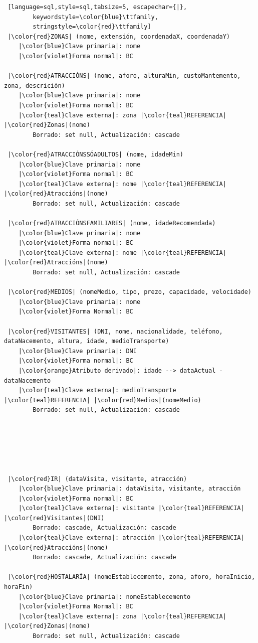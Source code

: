 \documentclass[12pt,a4paper]{book}
\theoremstyle{definition}
\theoremstyle{break}
\begin{document}
	\begin{lstlisting} [language=sql,style=sql,tabsize=5, escapechar={|},
		keywordstyle=\color{blue}\ttfamily,
		stringstyle=\color{red}\ttfamily]
 |\color{red}ZONAS| (nome, extensión, coordenadaX, coordenadaY)
	|\color{blue}Clave primaria|: nome
	|\color{violet}Forma normal|: BC
	
 |\color{red}ATRACCIÓNS| (nome, aforo, alturaMin, custoMantemento, zona, descrición)
 	|\color{blue}Clave primaria|: nome
 	|\color{violet}Forma normal|: BC
 	|\color{teal}Clave externa|: zona |\color{teal}REFERENCIA| |\color{red}Zonas|(nome)
 		Borrado: set null, Actualización: cascade
		
 |\color{red}ATRACCIÓNSSÓADULTOS| (nome, idadeMin)
	|\color{blue}Clave primaria|: nome
	|\color{violet}Forma normal|: BC
	|\color{teal}Clave externa|: nome |\color{teal}REFERENCIA| |\color{red}Atraccións|(nome)
		Borrado: set null, Actualización: cascade
		
 |\color{red}ATRACCIÓNSFAMILIARES| (nome, idadeRecomendada)
	|\color{blue}Clave primaria|: nome
	|\color{violet}Forma normal|: BC
	|\color{teal}Clave externa|: nome |\color{teal}REFERENCIA| |\color{red}Atraccións|(nome)
		Borrado: set null, Actualización: cascade
		
 |\color{red}MEDIOS| (nomeMedio, tipo, prezo, capacidade, velocidade)
	|\color{blue}Clave primaria|: nome
	|\color{violet}Forma Normal|: BC
		
 |\color{red}VISITANTES| (DNI, nome, nacionalidade, teléfono, dataNacemento, altura, idade, medioTransporte) 
	|\color{blue}Clave primaria|: DNI
	|\color{violet}Forma normal|: BC
	|\color{orange}Atributo derivado|: idade --> dataActual - dataNacemento
	|\color{teal}Clave externa|: medioTransporte |\color{teal}REFERENCIA| |\color{red}Medios|(nomeMedio)
		Borrado: set null, Actualización: cascade
		
		
		
		
		
		
 |\color{red}IR| (dataVisita, visitante, atracción)
	|\color{blue}Clave primaria|: dataVisita, visitante, atracción
	|\color{violet}Forma normal|: BC
	|\color{teal}Clave externa|: visitante |\color{teal}REFERENCIA| |\color{red}Visitantes|(DNI)
		Borrado: cascade, Actualización: cascade
	|\color{teal}Clave externa|: atracción |\color{teal}REFERENCIA| |\color{red}Atraccións|(nome)
		Borrado: cascade, Actualización: cascade
		
 |\color{red}HOSTALARÍA| (nomeEstablecemento, zona, aforo, horaInicio, horaFin)
	|\color{blue}Clave primaria|: nomeEstablecemento
	|\color{violet}Forma Normal|: BC
	|\color{teal}Clave externa|: zona |\color{teal}REFERENCIA| |\color{red}Zonas|(nome)
		Borrado: set null, Actualización: cascade
		

\end{lstlisting}
\end{document}
